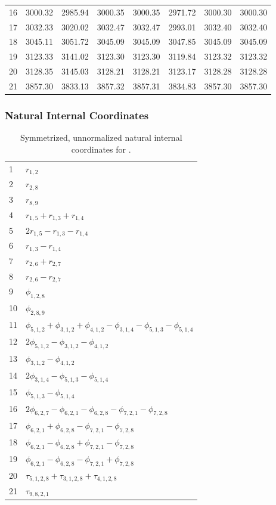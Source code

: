 \documentclass[10pt,oneside]{article}
\begin{document}
\begin{table}[h!]
\begin{tabular}{cccccccc}
16 &   3000.32 & 2985.94 & 3000.35 & 3000.35 &      2971.72 & 3000.30 & 3000.30 \\
17 &   3032.33 & 3020.02 & 3032.47 & 3032.47 &      2993.01 & 3032.40 & 3032.40 \\
18 &   3045.11 & 3051.72 & 3045.09 & 3045.09 &      3047.85 & 3045.09 & 3045.09 \\
19 &   3123.33 & 3141.02 & 3123.30 & 3123.30 &      3119.84 & 3123.32 & 3123.32 \\
20 &   3128.35 & 3145.03 & 3128.21 & 3128.21 &      3123.17 & 3128.28 & 3128.28 \\
21 &   3857.30 & 3833.13 & 3857.32 & 3857.31 &      3834.83 & 3857.30 & 3857.30 \\
\bottomrule
\end{tabular}
\end{table}

\clearpage

\subsubsection*{Natural Internal Coordinates}
\begin{table}[h!]
\centering
\caption{Symmetrized, unnormalized natural internal coordinates for .}
\small
\begin{tabular}{ll}
  1   & $r_{1,2}$ \\
  2   & $r_{2,8}$ \\
  3   & $r_{8,9}$ \\
  4   & $r_{1,5} + r_{1,3} + r_{1,4}$ \\
  5   & $2r_{1,5} - r_{1,3} - r_{1,4}$ \\
  6   & $r_{1,3} - r_{1,4}$ \\
  7   & $r_{2,6} + r_{2,7}$ \\
  8   & $r_{2,6} - r_{2,7}$ \\
  9   & $\phi_{1,2,8}$ \\
  10  & $\phi_{2,8,9}$ \\
  11  & $\phi_{5,1,2} + \phi_{3,1,2} + \phi_{4,1,2} - \phi_{3,1,4} - \phi_{5,1,3} - \phi_{5,1,4}$ \\
  12  & $2\phi_{5,1,2} - \phi_{3,1,2} - \phi_{4,1,2}$ \\
  13  & $\phi_{3,1,2} - \phi_{4,1,2}$ \\
  14  & $2\phi_{3,1,4} - \phi_{5,1,3} - \phi_{5,1,4}$ \\
  15  & $\phi_{5,1,3} - \phi_{5,1,4}$ \\
  16  & $2\phi_{6,2,7} - \phi_{6,2,1} - \phi_{6,2,8} - \phi_{7,2,1} - \phi_{7,2,8}$ \\
  17  & $\phi_{6,2,1} + \phi_{6,2,8} - \phi_{7,2,1} - \phi_{7,2,8}$ \\
  18  & $\phi_{6,2,1} - \phi_{6,2,8} + \phi_{7,2,1} - \phi_{7,2,8}$ \\
  19  & $\phi_{6,2,1} - \phi_{6,2,8} - \phi_{7,2,1} + \phi_{7,2,8}$ \\
  20  & $\tau_{5,1,2,8} + \tau_{3,1,2,8} + \tau_{4,1,2,8}$ \\
  21  & $\tau_{9,8,2,1}$ \\
\end{tabular}
\end{table}
\end{document}
